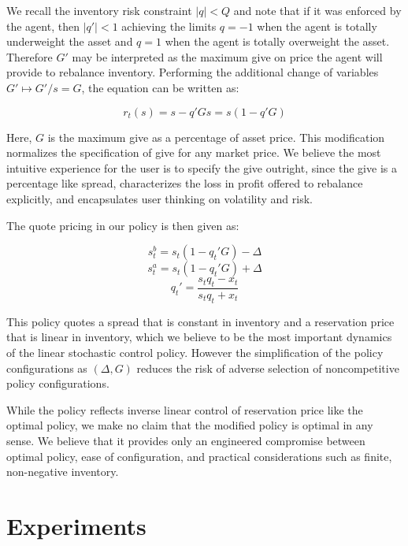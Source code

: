 \documentclass{article}
\begin{document}
We recall the inventory risk constraint $|q| < Q$ and note that if it was enforced by the agent, then $|q'| < 1$ achieving the limits $q = -1$ when the agent is totally underweight the asset and $q = 1$ when the agent is totally overweight the asset. Therefore $G'$ may be interpreted as the maximum give on price the agent will provide to rebalance inventory. Performing the additional change of variables $G' \mapsto G'/s = G$, the equation can be written as:

\begin{equation}
\label{eq:retailpricepercentage}
r_t(s) = s - q' G s = s (1 - q' G)
\end{equation}

Here, $G$ is the maximum give as a percentage of asset price. This modification normalizes the specification of give for any market price. We believe the most intuitive experience for the user is to specify the give outright, since the give is a percentage like spread, characterizes the loss in profit offered to rebalance explicitly, and encapsulates user thinking on volatility and risk.

The quote pricing in our policy is then given as:

\begin{equation}
\label{eq:retailbid}
s^b_t = s_t (1 - q_t' G) - \Delta
\end{equation}
\begin{equation}
\label{eq:retailask}
s^a_t = s_t (1 - q_t' G) + \Delta
\end{equation}
\begin{equation}
\label{eq:retailqprime}
q_t' = \frac{s_t q_t - x_t}{s_t q_t + x_t}
\end{equation}

This policy quotes a spread that is constant in inventory and a reservation price that is linear in inventory, which we believe to be the most important dynamics of the linear stochastic control policy. However the simplification of the policy configurations as $(\Delta, G)$ reduces the risk of adverse selection of noncompetitive policy configurations.

While the policy reflects inverse linear control of reservation price like the optimal policy, we make no claim that the modified policy is optimal in any sense. We believe that it provides only an engineered compromise between optimal policy, ease of configuration, and practical considerations such as finite, non-negative inventory.

\section{Experiments}
\label{sec:experiments}
\end{document}
